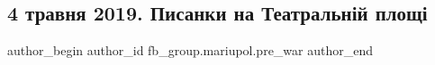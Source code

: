  
 
 
 
 

\subsection{4 травня 2019. Писанки на Театральній площі}
\label{sec:07_02_2023.fb.fb_group.mariupol.pre_war.3.4_travnya_2019__pisa}

\ifcmt
 author_begin
   author_id fb_group.mariupol.pre_war
 author_end
\fi
